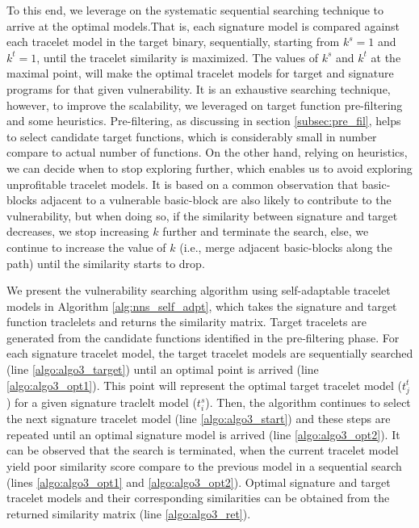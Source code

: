 To this end, we leverage on the systematic sequential searching technique to arrive at the optimal models.That is, each signature model is compared against each tracelet model in the target binary, sequentially, starting from $k^s=1$ and $k^t=1$, until the tracelet similarity is maximized. The values of $k^s$ and $k^t$ at the maximal point, will make the optimal tracelet models for target and signature programs for that given vulnerability. It is an exhaustive searching technique, however, to improve the scalability, we leveraged on target function pre-filtering and some heuristics. Pre-filtering, as discussing in section \ref{subsec:pre_fil}, helps to select candidate target functions, which is considerably  small in number compare to actual number of functions. On the other hand, relying on heuristics, we can decide when to stop exploring further, which enables us to avoid exploring unprofitable tracelet models.  It is based on a common observation that basic-blocks adjacent to a vulnerable basic-block are also likely to contribute to the vulnerability, but when doing so, if the similarity between signature and target decreases, we stop increasing $k$ further and terminate the search, else, we continue to increase the value of $k$ (i.e., merge adjacent basic-blocks along the path) until the similarity starts to drop.

We present the vulnerability searching algorithm using self-adaptable tracelet models in Algorithm \ref{alg:nns_self_adpt}, which takes the signature and target function traclelets and returns the similarity matrix. Target tracelets are generated from the candidate functions identified in the pre-filtering phase. For each signature tracelet model, the target tracelet models are sequentially searched (line \ref{algo:algo3_target}) until an optimal point is arrived (line \ref{algo:algo3_opt1}). This point will represent the optimal target tracelet model ($t^t_j$) for a given signature traclelt model ($t^s_i$). Then, the algorithm continues to select the next signature tracelet model (line \ref{algo:algo3_start}) and these steps are repeated until an optimal signature model is arrived (line \ref{algo:algo3_opt2}). It can be observed that the search is terminated, when the current tracelet model yield poor similarity score compare to the previous model in a sequential search (lines \ref{algo:algo3_opt1} and \ref{algo:algo3_opt2}). Optimal signature and target tracelet models and their corresponding similarities can be obtained from the returned similarity matrix (line \ref{algo:algo3_ret}). 



